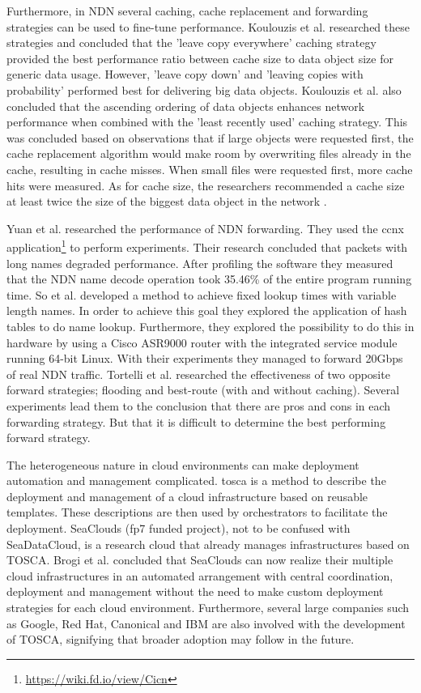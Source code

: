 Furthermore, in NDN several caching, cache replacement and forwarding strategies can be used to fine-tune performance. Koulouzis et al. researched these strategies and concluded that the 'leave copy everywhere' caching strategy provided the best performance ratio between cache size to data object size for generic data usage. However, 'leave copy down' and 'leaving copies with probability' performed best for delivering big data objects. Koulouzis et al. also concluded that the ascending ordering of data objects enhances network performance when combined with the 'least recently used' caching strategy. This was concluded based on observations that if large objects were requested first, the cache replacement algorithm would make room by overwriting files already in the cache, resulting in cache misses. When small files were requested first, more cache hits were measured. As for cache size, the researchers recommended a cache size at least twice the size of the biggest data object in the network \cite{koulouzis2018information}.

Yuan et al. \cite{yuan2012scalable} researched the performance of NDN forwarding. They used the \gls{ccnx} application\footnote{\url{https://wiki.fd.io/view/Cicn}} to perform experiments. Their research concluded that packets with long names degraded performance. After profiling the software they measured that the NDN name decode operation took 35.46\% of the entire program running time. So et al. \cite{so2013named} developed a method to achieve fixed lookup times with variable length names. In order to achieve this goal they explored the application of hash tables to do name lookup. Furthermore, they explored the possibility to do this in hardware by using a Cisco ASR9000 router with the integrated service module running 64-bit Linux. With their experiments they managed to forward 20Gbps of real NDN traffic. Tortelli et al. \cite{tortelli2013performance} researched the effectiveness of two opposite forward strategies; flooding and best-route (with and without caching). Several experiments lead them to the conclusion that there are pros and cons in each forwarding strategy. But that it is difficult to determine the best performing forward strategy.

The heterogeneous nature in cloud environments can make deployment automation and management complicated. \gls{tosca} \cite{tosca-standard} is a method to describe the deployment and management of a cloud infrastructure based on reusable templates. These descriptions are then used by orchestrators to facilitate the deployment. SeaClouds \cite{seaclouds-website} (\gls{fp7} funded project), not to be confused with SeaDataCloud, is a research cloud that already manages infrastructures based on TOSCA. Brogi et al. \cite{brogi2015adaptive} concluded that SeaClouds can now realize their multiple cloud infrastructures in an automated arrangement with central coordination, deployment and management without the need to make custom deployment strategies for each cloud environment. Furthermore, several large companies such as Google, Red Hat, Canonical and IBM are also involved with the development of TOSCA, signifying that broader adoption may follow in the future.


